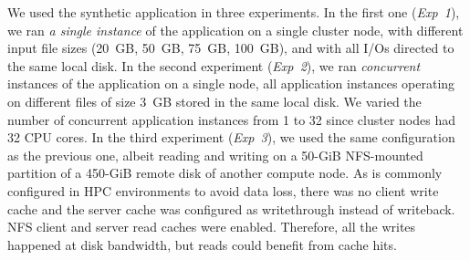 \documentclass[conference]{IEEEtran}
\begin{document}
        We used the synthetic application in three experiments. In the
        first one (\textit{Exp~1}), we ran \emph{a single instance} of
        the application on a single cluster node, with different input file
        sizes (20~GB, 50~GB, 75~GB, 100~GB), and with all I/Os directed to
        the same local disk.
        In the second experiment (\textit{Exp~2}), we ran
        \emph{concurrent} instances of the application on a single node,
        all application instances operating on different files of size 3~GB
        stored in the same local disk. We varied the number of concurrent
        application instances from 1 to 32 since cluster nodes had 32 CPU
        cores.
        In the third experiment (\textit{Exp~3}), we used the same
        configuration as the previous one, albeit reading and writing
        on a 50-GiB NFS-mounted partition of a 450-GiB remote disk of
        another compute node. As is commonly configured in HPC
        environments to avoid data loss, there was no client write cache
        and the server cache was configured as writethrough instead of
        writeback. NFS client and server read caches were enabled. 
        Therefore, all the writes happened at disk bandwidth, but
        reads could benefit from cache hits.
\end{document}
